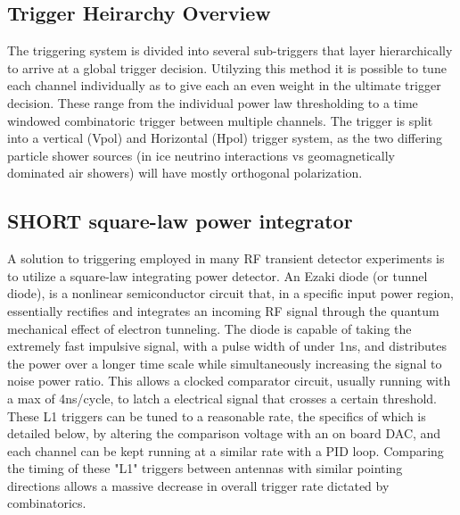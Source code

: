 	\subsection{Trigger Heirarchy Overview}
		The triggering system is divided into several sub-triggers that layer hierarchically to arrive at a global trigger decision.  Utilyzing this method it is possible to tune each channel individually as to give each an even weight in the ultimate trigger decision.  These range from the individual power law thresholding to a time windowed combinatoric trigger between multiple channels.  The trigger is split into a vertical (Vpol) and Horizontal (Hpol) trigger system, as the two differing particle shower sources (in ice neutrino interactions vs geomagnetically dominated air showers) will have mostly orthogonal polarization.

	\subsection{SHORT square-law power integrator}
		A solution to triggering employed in many RF transient detector experiments is to utilize a square-law integrating power detector.  An Ezaki diode (or tunnel diode), is a nonlinear semiconductor circuit that, in a specific input power region, essentially rectifies and integrates an incoming RF signal through the quantum mechanical effect of electron tunneling.  The diode is capable of taking the extremely fast impulsive signal, with a pulse width of under 1ns, and distributes the power over a longer time scale while simultaneously increasing the signal to noise power ratio.  This allows a clocked comparator circuit, usually running with a max of 4ns/cycle, to latch a electrical signal that crosses a certain threshold.  These L1 triggers can be tuned to a reasonable rate, the specifics of which is detailed below, by altering the comparison voltage with an on board DAC, and each channel can be kept running at a similar rate with a PID loop.  Comparing the timing of these "L1" triggers between antennas with similar pointing directions allows a massive decrease in overall trigger rate dictated by combinatorics.
